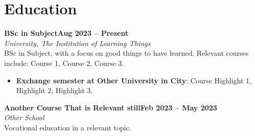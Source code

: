 \documentclass[10pt,a4paper]{article}
\newcommand{\entry}[4]{
    \textbf{#1}\hfill\textbf{#2}\\[0pt]
    \textit{#3}\\[-0.5pt]
    #4
    \vspace{4.5pt}
}
\begin{document}
\section{Education}
\entry{BSc in Subject}{Aug 2023 -- Present}
{University, The Institution of Learning Things}{BSc in Subject, with a focus on good things to have learned. Relevant courses include: Course 1, Course 2, Course 3.
\begin{itemize}
    \item \textbf{Exchange semester at Other University in City}:\newline 
    Course Highlight 1, Highlight 2, Highlight 3.
\end{itemize}
}
\entry{Another Course That is Relevant still}{Feb 2023 -- May 2023}
{Other School}{
Vocational education in a relevant topic.
}
\end{document}
